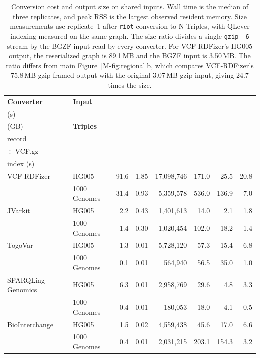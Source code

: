 \documentclass[11pt]{article}
\begin{document}
\begin{table}[!htbp]
\caption{Conversion cost and output size on shared inputs.
Wall time is the median of three replicates, and peak RSS is the largest observed resident memory.
Size measurements use replicate~1 after \texttt{riot} conversion to N-Triples, with QLever indexing measured on the same graph.
The size ratio divides a single \texttt{gzip -6} stream by the BGZF input read by every converter.
For VCF-RDFizer's HG005 output, the reserialized graph is 89.1\,MB and the BGZF input is 3.50\,MB.
The ratio differs from main Figure~\ref{M-fig:regional}b, which compares VCF-RDFizer's 75.8\,MB gzip-framed output with the original 3.07\,MB gzip input, giving 24.7 times the size.
}\label{tab:converters-cost}%
\centering\footnotesize\setlength{\tabcolsep}{0pt}\renewcommand{\arraystretch}{1.1}%
\newcommand{\hd}[1]{\textbf{\begin{tabular}[b]{@{}c@{}}#1\end{tabular}}}%
\begin{tabular*}{\textwidth}{@{\extracolsep{\fill}}llrrrrrr@{}}
\toprule
\textbf{Converter} & \textbf{Input} & \hd{Wall\\(s)} & \hd{Peak RSS\\(GB)} & \textbf{Triples} & \hd{Triples per\\record} & \hd{N-Triples.gz\\$\div$ VCF.gz} & \hd{QLever\\index (s)}\\
\midrule
VCF-RDFizer & HG005 & 91.6 & 1.85 & 17,098,746 & 171.0 & 25.5 & 20.8\\
 & 1000 Genomes & 31.4 & 0.93 & 5,359,578 & 536.0 & 136.9 & 7.0\\
JVarkit & HG005 & 2.2 & 0.43 & 1,401,613 & 14.0 & 2.1 & 1.8\\
 & 1000 Genomes & 1.4 & 0.30 & 1,020,454 & 102.0 & 18.2 & 1.4\\
TogoVar & HG005 & 1.3 & 0.01 & 5,728,120 & 57.3 & 15.4 & 6.8\\
 & 1000 Genomes & 0.1 & 0.01 & 564,940 & 56.5 & 35.0 & 1.0\\
SPARQLing Genomics & HG005 & 6.3 & 0.01 & 2,958,769 & 29.6 & 4.8 & 3.3\\
 & 1000 Genomes & 0.4 & 0.01 & 180,053 & 18.0 & 4.1 & 0.5\\
BioInterchange & HG005 & 1.5 & 0.02 & 4,559,438 & 45.6 & 17.0 & 6.6\\
 & 1000 Genomes & 0.4 & 0.01 & 2,031,215 & 203.1 & 154.3 & 3.2\\
\bottomrule
\end{tabular*}
\end{table}
\end{document}
